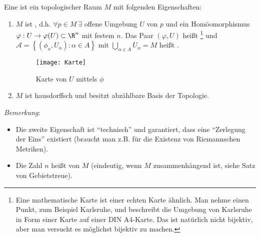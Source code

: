 \begin{definition}\label{def:topologischeMannigfaltigkeit}
  Eine  ist ein topologischer Raum \( M \) mit folgenden Eigenschaften:
  \begin{enumerate}
    \item \( M \) ist \label{def:lokalEuklidisch}, d.h. \( \forall p \in M \ \exists \) offene Umgebung \( U \) von \( p \) und ein Homöomorphismus \( \varphi: U \to \varphi(U) \subset \R^n \) mit festem \( n \). Das Paar \( (\varphi, U) \) heißt \label{def:karte}\footnote{Eine mathematische Karte ist einer echten Karte ähnlich. Man nehme einen Punkt, zum Beispiel Karlsruhe, und beschreibt die Umgebung von Karlsruhe in Form einer Karte auf einer DIN A4-Karte. Das ist natürlich nicht bijektiv, aber man versucht es möglichst bijektiv zu machen.} und \( \mathcal{A} = \left \{ (\phi_a, U_\alpha) : \alpha \in A \right \} \) mit \( \bigcup_{\alpha \in A}U_\alpha = M \) heißt \label{def:atlas}.
    \begin{figure}[H]
      \texttt{[image: Karte]}
      \caption{Karte von \( U \) mittels \( \phi \)}
    \end{figure}
    \item \( M \) ist hausdorffsch und besitzt abzählbare Basis der Topologie.
  \end{enumerate}
  \emph{Bemerkung}:
  \begin{itemize}
    \item Die zweite Eigenschaft ist ``technisch'' und garantiert, dass eine ``Zerlegung der Eins'' existiert (braucht man z.B. für die Existenz von Riemannschen Metriken). 
    \item Die Zahl \( n \) heißt \label{def:dimension} von \( M \) (eindeutig, wenn \( M \) zusammenhängend ist, siehe Satz von Gebietstreue). 
  \end{itemize}
\end{definition}

